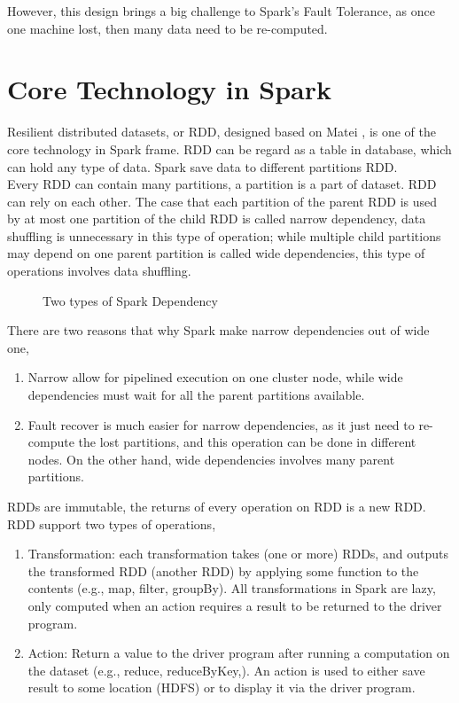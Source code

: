 However, this design brings a big challenge to Spark’s Fault Tolerance, as once one machine lost, then many data need to be re-computed.

\section{Core Technology in Spark\cite{ryza2015advanced}}
Resilient distributed datasets, or RDD, designed based on Matei \cite{zaharia2012resilient}, is one of the core technology in Spark frame. RDD can be regard as a table in database, which can hold any type of data. Spark save data to different partitions RDD.\\


Every RDD can contain many partitions, a partition is a part of dataset. RDD can rely on each other. The case that each partition of the parent RDD is used by at most one partition of the child RDD is called narrow dependency, data shuffling is unnecessary in this type of operation; while multiple child partitions may depend on one parent partition is called wide dependencies, this type of operations involves data shuffling.
\begin{figure}[h]
	\centering
	\caption{Two types of Spark Dependency\cite{zaharia2016architecture}}
\end{figure} 

There are two reasons that why Spark make narrow dependencies out of wide one\cite{zaharia2016architecture},
\begin{enumerate}
	\item Narrow allow for pipelined execution on one cluster node, while wide dependencies must wait for all the parent partitions available.
	\item Fault recover is much easier for narrow dependencies, as it just need to re-compute the lost partitions, and this operation can be done in different nodes. On the other hand, wide dependencies involves many parent partitions.
\end{enumerate}

RDDs are immutable, the returns of every operation on RDD is a new RDD. RDD support two types of operations,

\begin{enumerate}
	\item Transformation: each transformation takes (one or more) RDDs, and outputs the transformed RDD (another RDD) by applying some function to the contents (e.g., map, filter, groupBy). All transformations in Spark are lazy, only computed when an action requires a result to be returned to the driver program.
	\item Action: Return a value to the driver program after running a computation on the dataset (e.g., reduce, reduceByKey,). An action is used to either save result to some location (HDFS) or to display it via the driver program.
\end{enumerate}

